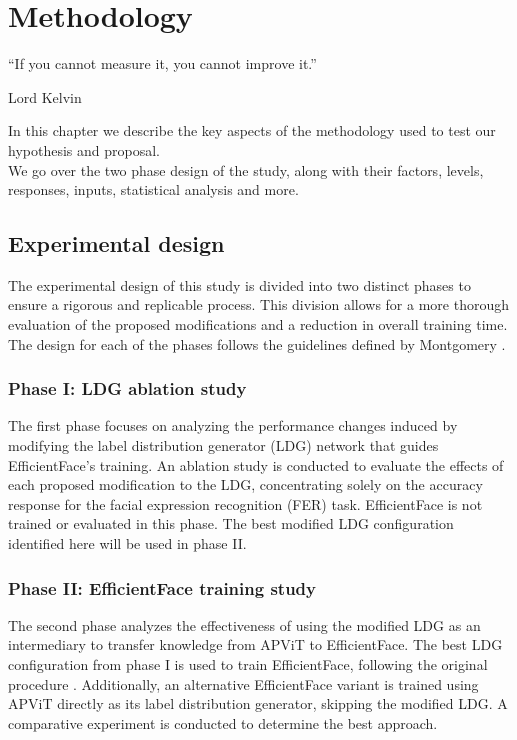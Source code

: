 \chapter{Methodology}
\label{chapter:methodology}
\epigraph{``If you cannot measure it, you cannot improve it.''}{\vspace{10pt}Lord Kelvin }

\newpage

In this chapter we describe the key aspects of the methodology used to test our hypothesis and proposal.\\
We go over the two phase design of the study, along with their factors, levels, responses, inputs, statistical analysis and more.

\section{Experimental design}
\label{section:experiment-design}
The experimental design of this study is divided into two distinct phases to ensure a rigorous and replicable process. This division allows for a more thorough evaluation of the proposed modifications and a reduction in overall training time. The design for each of the phases follows the guidelines defined by Montgomery \cite{montgomery2017design}.

\subsection{Phase I: LDG ablation study}
The first phase focuses on analyzing the performance changes induced by modifying the label distribution generator (LDG) network that guides EfficientFace's training. An ablation study is conducted to evaluate the effects of each proposed modification to the LDG, concentrating solely on the accuracy response for the facial expression recognition (FER) task. EfficientFace is not trained or evaluated in this phase. The best modified LDG configuration identified here will be used in phase II.

\subsection{Phase II: EfficientFace training study}
The second phase analyzes the effectiveness of using the modified LDG as an intermediary to transfer knowledge from APViT to EfficientFace. The best LDG configuration from phase I is used to train EfficientFace, following the original procedure \cite{eff-face2021}. Additionally, an alternative EfficientFace variant is trained using APViT directly as its label distribution generator, skipping the modified LDG. A comparative experiment is conducted to determine the best approach.

